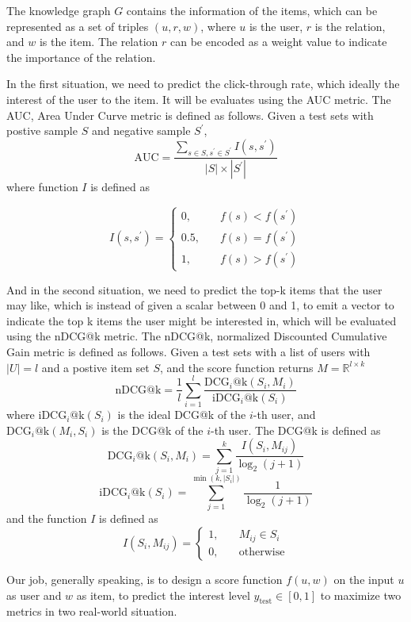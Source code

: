 \documentclass{article}
\begin{document}
The knowledge graph $G$ contains the information of the items, which can be represented as a set of triples $(u, r, w)$, where $u$ is the user, $r$ is the relation, and $w$ is the item. The relation $r$ can be encoded as a weight value to indicate the importance of the relation.

In the first situation, we need to predict the click-through rate, which ideally the interest of the user to the item. It will be evaluates using the AUC metric. The AUC, Area Under Curve metric is defined as follows. Given a test sets with postive sample $S$ and negative sample $S^{\prime}$, 
\[
    \text{AUC} = \frac{\sum_{s \in S, s^{\prime}\in S^{\prime}} I(s, s^{\prime})}{|S|\times|S^{\prime}|}
\]
where function $I$ is defined as

\[
    I(s, s^{\prime}) = \left\{
        \begin{aligned}
            0, & \quad f(s) < f(s^{\prime}) \\
            0.5, & \quad f(s) = f(s^{\prime}) \\
            1, & \quad f(s) > f(s^{\prime})
        \end{aligned}
    \right.
\]

And in the second situation, we need to predict the top-k items that the user may like, which is instead of given a scalar between 0 and 1, to emit a vector to indicate the top k items the user might be interested in, which will be evaluated using the nDCG@k metric. The nDCG@k, normalized Discounted Cumulative Gain metric is defined as follows. Given a test sets with a list of users with $|U| = l$ and a postive item set $S$, and the score function returns $M = \mathbb{R}^{l\times k}$
\[
    \text{nDCG@k} = \frac{1}{l} \sum_{i = 1}^{l} \frac{\text{DCG}_i\text{@k}(S_i, M_i)}{\text{iDCG}_i\text{@k}(S_i)}
\]
where $\text{iDCG}_i\text{@k}(S_i)$ is the ideal DCG@k of the $i$-th user, and $\text{DCG}_i\text{@k}(M_i, S_i)$ is the DCG@k of the $i$-th user. The DCG@k is defined as
\[
    \text{DCG}_i\text{@k}(S_i, M_i) = \sum_{j = 1}^{k} \frac{I(S_i, M_{ij})}{\log_2(j+1)}
\]
\[
    \text{iDCG}_i\text{@k}(S_i) = \sum_{j = 1}^{\min(k, |S_i|)} \frac{1}{\log_2(j+1)}
\]
and the function $I$ is defined as
\[
    I(S_i, M_{ij}) = \left\{
        \begin{aligned}
            1, & \quad M_{ij} \in S_i \\
            0, & \quad \text{otherwise}
        \end{aligned}
    \right.
\]

Our job, generally speaking, is to design a score function $f(u, w)$ on the input $u$ as user and $w$ as item, to predict the interest level $y_{\text{test}} \in \left[0,1\right]$ to maximize two metrics in two real-world situation.
\end{document}
